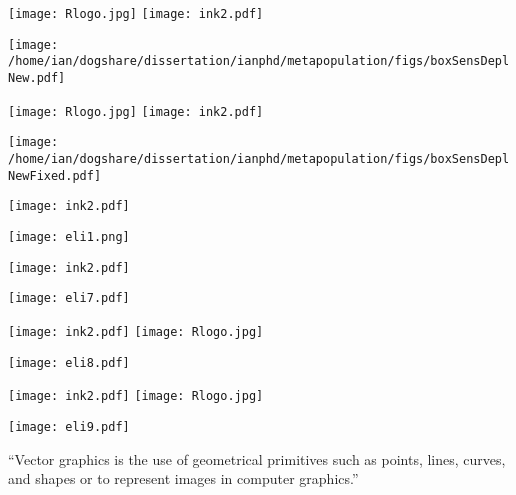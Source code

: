 \documentclass[12pt,mathserif]{beamer}
\newcommand{\bl}[1]{\color{titleblue}{#1 }\color{black}}
\newcommand{\rd}[1]{\color{red}{#1 }\color{black}}
\newcommand{\bk}[1]{\color{black}{#1 }\color{black}}
\begin{document}
\begin{frame}
{\texttt{[image: Rlogo.jpg]} \textrightarrow \texttt{[image: ink2.pdf]} \textrightarrow \bk{\textrm{\LaTeX}} \hfill \hfill \hfill \bl{edit PDF}}
\begin{center}\texttt{[image: /home/ian/dogshare/dissertation/ianphd/metapopulation/figs/boxSensDeplNew.pdf]}
\end{center}\end{frame}

\begin{frame}
{\texttt{[image: Rlogo.jpg]} \textrightarrow \texttt{[image: ink2.pdf]} \textrightarrow \bk{\textrm{\LaTeX}} \hfill \hfill \hfill \bl{edit PDF}}
\begin{center}\texttt{[image: /home/ian/dogshare/dissertation/ianphd/metapopulation/figs/boxSensDeplNewFixed.pdf]}
\end{center}\end{frame}


\begin{frame}
{\texttt{[image: ink2.pdf]} \textrightarrow \bk{\textrm{\LaTeX}} \hfill \hfill \hfill \bl{trace bitmap, add text}}
\vspace{-.2in}\begin{center}\texttt{[image: eli1.png]}
\end{center}\end{frame}


\begin{frame}
{\texttt{[image: ink2.pdf]} \textrightarrow \bk{\textrm{\LaTeX}} \hfill \hfill \hfill \bl{trace bitmap, add text}}
\begin{center}\texttt{[image: eli7.pdf]}
\end{center}\end{frame}


\begin{frame}
{\texttt{[image: ink2.pdf]} \textrightarrow \texttt{[image: Rlogo.jpg]} \hfill \hfill \hfill \bl{trace bitmap, export}}
\begin{center}\texttt{[image: eli8.pdf]}
\end{center}\end{frame}


\begin{frame}
{\texttt{[image: ink2.pdf]} \textrightarrow \texttt{[image: Rlogo.jpg]} \hfill \hfill \hfill \bl{trace bitmap, export}}
\vspace{-0.5in}\begin{center}\texttt{[image: eli9.pdf]}
\pause
\end{center}
\vspace{-0.8in} ``Vector graphics is the use of geometrical primitives such as points, lines, curves, and shapes or \rd{polygon(s), which are all based upon mathematical equations,} to represent images in computer graphics.''
\end{frame}
\end{document}
